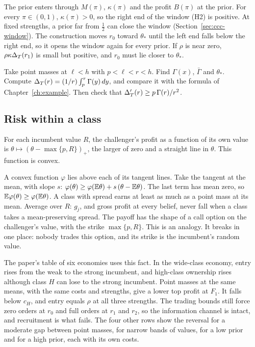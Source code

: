 The prior enters through \(M(\pi)\), \(\kappa(\pi)\) and the profit \(B(\pi)\) at the prior.
For every \(\pi\in(0,1)\), \(\kappa(\pi)>0\), so the right end of the window (H2) is positive.
At fixed strengths, a prior far from \(\tfrac12\) can close the window (Section~\ref{sec:ccc-window}).
The construction moves \(r_0\) toward \(\theta_*\) until the left end falls below the right end, so it opens the window again for every prior.
If \(\rho\) is near zero, \(\rho\kappa\Delta_T(r_1)\) is small but positive, and \(r_0\) must lie closer to \(\theta_*\).

\begin{checkyourself}
Take point masses at \(\ell<h\) with \(p<\ell<r<h\).
Find \(\Gamma(x)\), \(\bar\Gamma\) and \(\theta_*\).
Compute \(\Delta_T(r)=(1/r)\int_p^r\Gamma(y)\,dy\), and compare it with the formula of Chapter~\ref{ch:example}.
Then check that \(\Delta_T'(r)\ge p\,\Gamma(r)/r^2\).
\label{q:robustness-points}
\end{checkyourself}

\subsection{Risk within a class}

For each incumbent value \(R\), the challenger's profit as a function of its own value is \(\theta\mapsto(\theta-\max\{p,R\})_+\), the larger of zero and a straight line in \(\theta\). This function is convex.

\begin{intuition}
A convex function \(\varphi\) lies above each of its tangent lines.
Take the tangent at the mean, with slope \(s\): \(\varphi(\theta)\ge\varphi(\mathbb{E}\theta)+s\,(\theta-\mathbb{E}\theta)\).
The last term has mean zero, so \(\mathbb{E}\varphi(\theta)\ge\varphi(\mathbb{E}\theta)\).
A class with spread earns at least as much as a point mass at its mean.
Average over \(R\): \(g_j\), and gross profit at every belief, never fall when a class takes a mean-preserving spread.
The payoff has the shape of a call option on the challenger's value, with the strike \(\max\{p,R\}\). This is an analogy. It breaks in one place: nobody trades this option, and its strike is the incumbent's random value.
\end{intuition}

The paper's table of six economies uses this fact.
In the wide-class economy, entry rises from the weak to the strong incumbent, and high-class ownership rises although class \(H\) can lose to the strong incumbent.
Point masses at the same means, with the same costs and strengths, give a lower top profit at \(F_1\).
It falls below \(c_H\), and entry equals \(\rho\) at all three strengths.
The trading bounds still force zero orders at \(r_0\) and full orders at \(r_1\) and \(r_2\), so the information channel is intact, and recruitment is what fails.
The four other rows show the reversal for a moderate gap between point masses, for narrow bands of values, for a low prior and for a high prior, each with its own costs.

